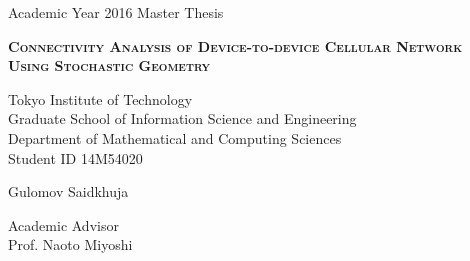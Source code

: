 \begin{titlepage}
\newpage

\begin{center}
Academic Year 2016 Master Thesis
\end{center}
\vspace{8em}

\begin{center}
\textsc{ \textbf{Connectivity Analysis of Device-to-device Cellular Network\\Using Stochastic Geometry}}
\end{center}
\vspace{2.5em}

\begin{center}
Tokyo Institute of Technology\\
Graduate School of Information Science and Engineering\\
Department of Mathematical and Computing Sciences\\
Student ID 14M54020
\end{center}
\vspace{0.5em}

\begin{center}
Gulomov Saidkhuja
\end{center}
\vspace{0.5em}

\begin{center}
Academic Advisor\\
Prof. Naoto Miyoshi
\end{center}

\end{titlepage}